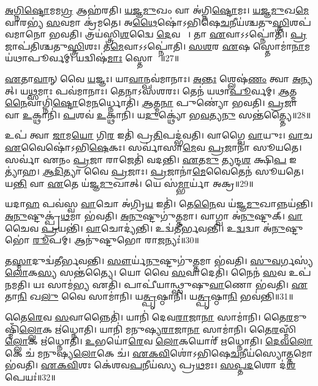 \ul{𑌅}\ul{𑌗𑍍𑌨𑌿}\ul{𑌷𑍍𑌟𑍋}𑌮𑌮\ul{𑌗𑍍𑌰} 𑌆𑌹॑𑌰𑌤𑌿।
\ul{𑌯}\ul{𑌜𑍍𑌞}\ul{𑌮𑍁}𑌖𑌂 𑌵𑌾 𑌅॑𑌗𑍍𑌨𑌿\ul{𑌷𑍍𑌟𑍋}𑌮𑌃।
\ul{𑌯}\ul{𑌜𑍍𑌞}\ul{𑌮𑍁}𑌖\ul{𑌮𑍇}𑌵𑌾𑌰𑌭𑍍𑌯॑ \ul{𑌸}𑌵𑌮𑌾 𑌕𑍍𑌰॑𑌮𑌤𑍇।
𑌅\ul{𑌥𑍈}𑌷𑍋॑\-𑌽𑌭𑌿𑌷𑍇\ul{𑌚}𑌨𑍀𑌯॑𑌶𑍍𑌚𑌤𑍁\-\ul{𑌸𑍍𑌤𑍍𑌰𑌿}\ul{}𑌶𑌪॑𑌵𑌮𑌾𑌨𑍋 𑌭𑌵𑌤𑌿।
𑌤𑍍𑌰𑌯॑𑌸𑍍𑌤𑍍𑌰𑌿\ul{𑌶}𑌦𑍍𑌵𑍈 \ul{𑌦𑍇}𑌵𑌤𑌾𑌃᳚।
𑌤𑌾 \ul{𑌏}𑌵𑌾𑌽𑌽𑌪𑍍𑌨𑍋॑𑌤𑌿।
\ul{𑌪𑍍𑌰}𑌜𑌾𑌪॑𑌤𑌿𑌶𑍍𑌚𑌤𑍁\ul{𑌸𑍍𑌤𑍍𑌰𑌿}\ul{}𑌶𑌃।
𑌤\ul{𑌮𑍇}𑌵𑌾𑌽𑌽𑌪𑍍𑌨𑍋॑𑌤𑌿।
\ul{𑌸}\ul{}\ul{𑌶}𑌰 \ul{𑌏}𑌷 𑌸𑍍𑌤𑍋𑌮𑌾॑\ul{𑌨𑌾}𑌮𑌯॑𑌥𑌾𑌪𑍂𑌰𑍍𑌵𑌮𑍍।
𑌯𑌦𑍍𑌵𑌿𑌷॑\ul{𑌮𑌾𑌃} 𑌸𑍍𑌤𑍋𑌮𑌾𑌃᳚॥27॥

\ul{𑌏}𑌤𑌾\ul{𑌵𑌾}𑌨𑍍 𑌵𑍈 \ul{𑌯}𑌜𑍍𑌞𑌃।
𑌯𑌾\ul{𑌵𑌾}𑌨𑍍𑌪𑌵॑𑌮𑌾𑌨𑌾𑌃।
\ul{𑌅}\ul{𑌨𑍍𑌤𑌃} 𑌶𑍍𑌲𑍇𑌷॑\ul{𑌣𑌂} 𑌤𑍍𑌵𑌾 \ul{𑌅}𑌨𑍍𑌯𑌤𑍍।
𑌯\ul{𑌥𑍍𑌸}𑌮𑌾𑌃 𑌪𑌵॑𑌮𑌾𑌨𑌾𑌃।
𑌤𑍇𑌨𑌾𑌽𑌸॑𑌶𑌰𑌃।
𑌤𑍇𑌨॑ 𑌯𑌥𑌾\ul{𑌪𑍂}𑌰𑍍𑌵𑌮𑍍।
\ul{𑌆}𑌤𑍍𑌮\ul{𑌨𑍈}𑌵𑌾𑌗𑍍𑌨𑌿॑\ul{𑌷𑍍𑌟𑍋}𑌮𑍇\ul{𑌨}𑌰𑍍𑌧𑍍𑌨𑍋𑌤𑌿॑।
\ul{𑌆}𑌤𑍍𑌮\ul{𑌨𑌾} 𑌪𑍁𑌣𑍍𑌯𑍋॑ 𑌭𑌵𑌤𑌿।
\ul{𑌪𑍍𑌰}𑌜𑌾 𑌵𑌾 \ul{𑌉}𑌕𑍍𑌥𑌾𑌨𑌿॑।
\ul{𑌪}𑌶𑌵॑ \ul{𑌉}𑌕𑍍𑌥𑌾𑌨𑌿॑।
𑌯\ul{𑌦𑍁}𑌕𑍍𑌥𑍍𑌯𑍋॑ 𑌭\ul{𑌵}𑌤𑍍𑌯\ul{𑌨𑍁} 𑌸𑌨𑍍𑌤॑𑌤𑍍𑌤𑍍𑌯𑍈॥28॥\anuvakamend[𑌸𑍍𑌤𑍋𑌮𑌾᳚: \ul{𑌪}𑌶𑌵॑ \ul{𑌉}𑌕𑍍𑌥𑌾𑌨𑍍𑌯𑍇𑌕𑌂॑ 𑌚]

𑌉𑌪॑ 𑌤𑍍𑌵𑌾 \ul{𑌜𑌾}𑌮\ul{𑌯𑍋} 𑌗𑌿\ul{𑌰} 𑌇𑌤𑌿॑ 𑌪𑍍𑌰\ul{𑌤𑌿}𑌪𑌦𑍍𑌭॑𑌵𑌤𑌿।
𑌵𑌾𑌗𑍍𑌵𑍈 \ul{𑌵𑌾}𑌯𑍁𑌃।
\ul{𑌵𑌾}𑌚 \ul{𑌏}𑌵𑍈𑌷𑍋॑\-𑌽𑌭𑌿\ul{𑌷𑍇}𑌕𑌃।
𑌸𑌰𑍍𑌵𑌾॑𑌸𑌾\ul{𑌮𑍇}𑌵 \ul{𑌪𑍍𑌰}𑌜𑌾𑌨𑌾॑ 𑌸𑍂𑌯𑌤𑍇।
𑌸𑌰𑍍𑌵𑌾॑ 𑌏𑌨𑌂 \ul{𑌪𑍍𑌰}𑌜𑌾 𑌰𑌾𑌜𑍇𑌤𑌿॑ 𑌵𑌦𑌨𑍍𑌤𑌿।
\ul{𑌏}𑌤\ul{𑌮𑍁} 𑌤𑍍𑌯𑌨𑍍𑌦\ul{𑌶} 𑌕𑍍𑌷𑌿\ul{𑌪} 𑌇𑌤𑍍𑌯𑌾॑𑌹।
\ul{𑌆}\ul{𑌦𑌿}𑌤𑍍𑌯𑌾 𑌵𑍈 \ul{𑌪𑍍𑌰}𑌜𑌾𑌃।
\ul{𑌪𑍍𑌰}𑌜𑌾𑌨𑌾॑\ul{𑌮𑍇}𑌵𑍈𑌤𑍇𑌨॑ 𑌸𑍂𑌯𑌤𑍇।
𑌯\ul{𑌨𑍍𑌤𑌿} 𑌵𑌾 \ul{𑌏}𑌤𑍇 𑌯॑𑌜𑍍𑌞\ul{𑌮𑍁}𑌖𑌾𑌤𑍍।
𑌯𑍇 𑌸॑\ul{𑌮𑍍𑌭𑌾}𑌰𑍍𑌯𑌾॑ 𑌅𑌕𑍍𑌰\sn{}॥29॥

𑌯𑌦𑌾\ul{𑌹} 𑌪𑌵॑𑌸𑍍𑌵 \ul{𑌵𑌾}𑌚𑍋 𑌅॑𑌗𑍍𑌰𑌿\ul{𑌯} 𑌇𑌤𑌿॑।
𑌤𑍇\ul{𑌨𑍈}𑌵 𑌯॑𑌜𑍍𑌞\ul{𑌮𑍁}𑌖𑌾𑌨𑍍𑌨𑌯॑𑌨𑍍𑌤𑌿।
\ul{𑌅}\ul{𑌨𑍁}𑌷𑍍𑌟𑍁𑌕𑍍𑌪𑍍𑌰॑\ul{𑌥}𑌮𑌾 𑌭॑𑌵𑌤𑌿।
\ul{𑌅}\ul{𑌨𑍁}𑌷𑍍𑌟𑍁𑌗𑍁॑\ul{𑌤𑍍𑌤}𑌮𑌾।
𑌵𑌾𑌗𑍍𑌵𑌾 𑌅॑\ul{𑌨𑍁}𑌷𑍍𑌟𑍁𑌕𑍍।
\ul{𑌵𑌾}𑌚𑍈𑌵 \ul{𑌪𑍍𑌰}𑌯𑌨𑍍𑌤𑌿॑।
\ul{𑌵𑌾}𑌚𑍋𑌦𑍍𑌯॑𑌨𑍍𑌤𑌿।
𑌉𑌦𑍍𑌵॑𑌤𑍀𑌰𑍍𑌭𑌵𑌨𑍍𑌤𑌿।
𑌉\ul{𑌦𑍍𑌵}𑌦𑍍𑌵𑌾 𑌅॑\ul{𑌨𑍁}𑌷𑍍𑌟𑍁𑌭𑍋॑ \ul{𑌰𑍂}𑌪𑌮𑍍।
𑌆𑌨𑍁॑𑌷𑍍𑌟𑍁𑌭𑍋 𑌰𑌾\ul{𑌜}𑌨𑍍𑌯𑌃॑॥30॥

𑌤\ul{𑌸𑍍𑌮𑌾}𑌦𑍁𑌦𑍍𑌵॑𑌤𑍀𑌰𑍍𑌭𑌵𑌨𑍍𑌤𑌿।
\ul{𑌸𑍗}𑌰𑍍𑌯॑\ul{𑌨𑍁}𑌷𑍍𑌟𑍁𑌗𑍁॑\ul{𑌤𑍍𑌤}𑌮𑌾 𑌭॑𑌵𑌤𑌿।
\ul{𑌸𑍁}\ul{𑌵}𑌰𑍍𑌗𑌸𑍍𑌯॑ \ul{𑌲𑍋}𑌕\ul{𑌸𑍍𑌯} 𑌸𑌨𑍍𑌤॑𑌤𑍍𑌯𑍈।
𑌯𑍋 𑌵𑍈 \ul{𑌸}𑌵𑌾𑌦𑍇𑌤𑌿॑।
𑌨𑍈𑌨॑ \ul{𑌸}𑌵 𑌉𑌪॑𑌨𑌮𑌤𑌿।
𑌯𑌃 𑌸𑌾𑌮॑\ul{𑌭𑍍𑌯} 𑌏𑌤𑌿॑।
𑌪𑌾𑌪𑍀॑𑌯𑌾𑌨𑍍𑌥𑍍𑌸𑍁𑌷𑍁\ul{𑌵𑌾}𑌣𑍋 𑌭॑𑌵𑌤𑌿।
\ul{𑌏}𑌤𑌾\ul{𑌨𑌿} 𑌖\ul{𑌲𑍁} 𑌵𑍈 𑌸𑌾𑌮𑌾॑𑌨𑌿।
𑌯\ul{𑌤𑍍𑌪𑍃}𑌷𑍍𑌠𑌾𑌨𑌿॑।
𑌯\ul{𑌤𑍍𑌪𑍃}𑌷𑍍𑌠𑌾\ul{𑌨𑌿} 𑌭𑌵॑𑌨𑍍𑌤𑌿॥31॥

𑌤𑍈\ul{𑌰𑍇}𑌵 \ul{𑌸}𑌵𑌾𑌨𑍍𑌨𑍈𑌤𑌿॑।
𑌯𑌾𑌨𑌿॑ 𑌦𑍇𑌵\ul{𑌰𑌾}𑌜𑌾\ul{𑌨𑌾}\ul{} 𑌸𑌾𑌮𑌾॑𑌨𑌿।
𑌤𑍈\ul{𑌰}𑌮𑍁𑌷𑍍𑌮𑌿𑌁॑\ul{𑌲𑍍𑌲𑍋}𑌕 𑌋॑𑌧𑍍𑌨𑍋𑌤𑌿।
𑌯𑌾𑌨𑌿॑ 𑌮𑌨𑍁𑌷𑍍𑌯\ul{𑌰𑌾}𑌜𑌾\ul{𑌨𑌾}\ul{} 𑌸𑌾𑌮𑌾॑𑌨𑌿।
𑌤𑍈\ul{𑌰}𑌸𑍍𑌮𑌿𑌁\ul{𑌲𑍍𑌲𑍋}𑌕 𑌋॑𑌧𑍍𑌨𑍋𑌤𑌿।
\ul{𑌉}𑌭𑌯𑍋॑\ul{𑌰𑍇}𑌵 \ul{𑌲𑍋}𑌕𑌯𑍋𑌰𑍍॑ 𑌋𑌧𑍍𑌨𑍋𑌤𑌿।
\ul{𑌦𑍇}\ul{𑌵}\ul{𑌲𑍋}𑌕𑍇 𑌚॑ 𑌮𑌨𑍁𑌷𑍍𑌯\ul{𑌲𑍋}𑌕𑍇 𑌚॑।
\ul{𑌏}\ul{𑌕}\ul{𑌵𑌿}\ul{}𑌶𑍋॑\-𑌽𑌭𑌿𑌷𑍇\ul{𑌚}𑌨𑍀𑌯॑𑌸𑍍𑌯𑍋\ul{𑌤𑍍𑌤}𑌮𑍋 𑌭॑𑌵𑌤𑌿।
\ul{𑌏}\ul{𑌕}\ul{𑌵𑌿}\ul{}𑌶𑌃 𑌕𑍇॑𑌶𑌵\ul{𑌪}𑌨𑍀𑌯॑𑌸𑍍𑌯 𑌪𑍍𑌰\ul{𑌥}𑌮𑌃।
\ul{𑌸}\ul{𑌪𑍍𑌤}\ul{𑌦}𑌶𑍋 𑌦॑\ul{𑌶}𑌪𑍇𑌯𑌃॑॥32॥

